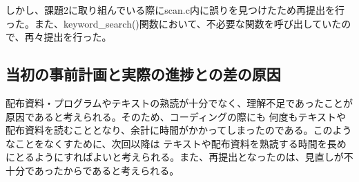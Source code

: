 \documentclass{jarticle}
\begin{document}
しかし、課題2に取り組んでいる際にscan.c内に誤りを見つけたため再提出を行った。また、keyword\_search()関数において、不必要な関数を呼び出していたので、再々提出を行った。
\subsection{当初の事前計画と実際の進捗との差の原因}
配布資料・プログラムやテキストの熟読が十分でなく、理解不足であったことが原因であると考えられる。そのため、コーディングの際にも
何度もテキストや配布資料を読むこととなり、余計に時間がかかってしまったのである。このようなことをなくすために、次回以降は
テキストや配布資料を熟読する時間を長めにとるようにすればよいと考えられる。また、再提出となったのは、見直しが不十分であったからであると考えられる。
\end{document}
